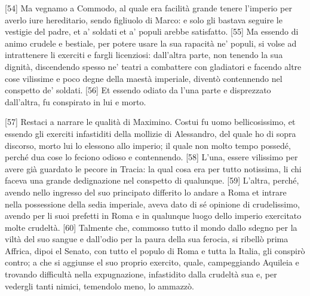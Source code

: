 {[}54{]} Ma vegnamo a Commodo, al quale era facilità grande tenere
l'imperio per averlo iure hereditario, sendo figliuolo di Marco: e solo
gli bastava seguire le vestigie del padre, et a' soldati et a' populi
arebbe satisfatto. {[}55{]} Ma essendo di animo crudele e bestiale, per
potere usare la sua rapacità ne' populi, si volse ad intrattenere li
exerciti e fargli licenziosi: dall'altra parte, non tenendo la sua
dignità, discendendo spesso ne' teatri a combattere con gladiatori e
facendo altre cose vilissime e poco degne della maestà imperiale,
diventò contennendo nel conspetto de' soldati. {[}56{]} Et essendo
odiato da l'una parte e disprezzato dall'altra, fu conspirato in lui e
morto.

\quebra

{[}57{]} Restaci a narrare le qualità di Maximino. Costui fu uomo
bellicosissimo, et essendo gli exerciti infastiditi della mollizie di
Alessandro, del quale ho di sopra discorso, morto lui lo elessono allo
imperio; il quale non molto tempo possedé, perché dua cose lo feciono
odioso e contennendo. {[}58{]} L'una, essere vilissimo per avere già
guardato le pecore in Tracia: la qual cosa era per tutto notissima, li
chi faceva una grande dedignazione nel conspetto di qualunque. {[}59{]}
L'altra, perché, avendo nello ingresso del suo principato differito lo
andare a Roma et intrare nella possessione della sedia imperiale, aveva
dato di sé opinione di crudelissimo, avendo per li suoi prefetti in Roma
e in qualunque luogo dello imperio exercitato molte crudeltà. {[}60{]}
Talmente che, commosso tutto il mondo dallo sdegno per la viltà del suo
sangue e dall'odio per la paura della sua ferocia, si ribellò prima
Affrica, dipoi el Senato, con tutto el populo di Roma e tutta la Italia,
gli conspirò contro; a che si aggiunse el suo proprio exercito, quale,
campeggiando Aquileia e trovando difficultà nella expugnazione,
infastidito dalla crudeltà sua e, per vedergli tanti nimici, temendolo
meno, lo ammazzò.

